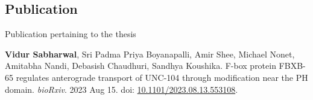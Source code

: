 \begin{appendices}
	
\chapter{Publication}{\centering Publication pertaining to the thesis}

\textbf{Vidur Sabharwal}, Sri Padma Priya Boyanapalli, Amir Shee, Michael Nonet, Amitabha Nandi, Debasish Chaudhuri, Sandhya Koushika. F-box protein FBXB-65 regulates anterograde transport of UNC-104 through modification near the PH domain. \textit{bioRxiv}. 2023 Aug 15. doi: \href{https://doi.org/10.1101/2023.08.13.553108}{10.1101/2023.08.13.553108}. 

\end{appendices}